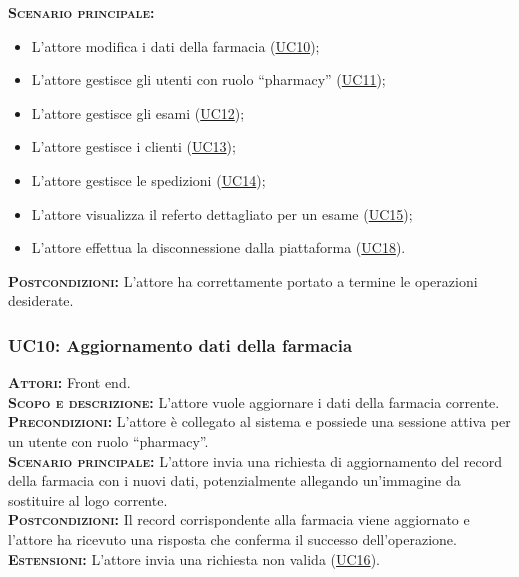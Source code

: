 \textsc{\textbf{Scenario principale:}} 
\begin{itemize}
    \item L'attore modifica i dati della farmacia (\hyperref[sec:UC10]{UC10});
    \item L'attore gestisce gli utenti con ruolo ``pharmacy'' (\hyperref[sec:UC11]{UC11});
    \item L'attore gestisce gli esami (\hyperref[sec:UC12]{UC12});
    \item L'attore gestisce i clienti (\hyperref[sec:UC13]{UC13});
    \item L'attore gestisce le spedizioni (\hyperref[sec:UC14]{UC14});
    \item L'attore visualizza il referto dettagliato per un esame (\hyperref[sec:UC15]{UC15});
    \item L'attore effettua la disconnessione dalla piattaforma (\hyperref[sec:UC18]{UC18}).
\end{itemize}
\textsc{\textbf{Postcondizioni:}} L'attore ha correttamente portato a termine le operazioni desiderate.

\subsubsection{UC10: Aggiornamento dati della farmacia}
\label{sec:UC10}
\textsc{\textbf{Attori:}} Front end.\\
\textsc{\textbf{Scopo e descrizione:}} L'attore vuole aggiornare i dati della farmacia corrente.\\
\textsc{\textsc{\textbf{Precondizioni:}}} L'attore è collegato al sistema e possiede una sessione attiva per un utente con ruolo ``pharmacy''.\\
\textsc{\textbf{Scenario principale:}} L'attore invia una richiesta di aggiornamento del record della farmacia con i nuovi dati, potenzialmente allegando un'immagine da sostituire al logo corrente.\\
\textsc{\textbf{Postcondizioni:}} Il record corrispondente alla farmacia viene aggiornato e l'attore ha ricevuto una risposta che conferma il successo dell'operazione.\\
\textsc{\textbf{Estensioni:}} L'attore invia una richiesta non valida (\hyperref[sec:UC16]{UC16}).



